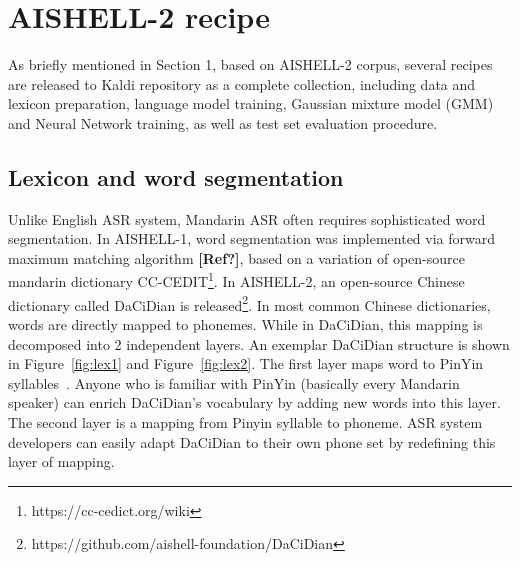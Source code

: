 \documentclass[a4paper]{article}
\begin{document}
\section{AISHELL-2 recipe}

As briefly mentioned in Section 1, based on AISHELL-2 corpus, several recipes are released to Kaldi repository as a complete collection, including data and lexicon preparation, language model training, Gaussian mixture model (GMM) and Neural Network training, as well as test set evaluation procedure.

\subsection{Lexicon and word segmentation}

Unlike English ASR system, Mandarin ASR often requires sophisticated word segmentation. 
In AISHELL-1, word segmentation was implemented via forward
maximum matching algorithm \textbf{[Ref?]}, based on a variation of open-source mandarin
dictionary CC-CEDIT\footnote{https://cc-cedict.org/wiki}. In AISHELL-2, an
open-source Chinese dictionary called DaCiDian is
released\footnote{https://github.com/aishell-foundation/DaCiDian}. In most
common Chinese dictionaries, words are directly mapped to phonemes. While in
DaCiDian, this mapping is decomposed into 2 independent layers. An exemplar
DaCiDian structure is shown in Figure~\ref{fig:lex1} and Figure~\ref{fig:lex2}. The first layer maps word to PinYin syllables~\cite{pinyin}. Anyone who is
  familiar with PinYin (basically every Mandarin speaker) can enrich DaCiDian's
  vocabulary by adding new words into this layer. The second layer is a mapping from Pinyin syllable to phoneme. ASR system
  developers can easily adapt DaCiDian to their own phone set by redefining this
  layer of mapping.
\end{document}
